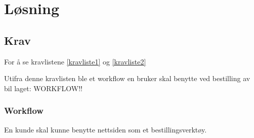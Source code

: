 \chapter{Løsning}

\section{Krav}
For å se kravlistene \ref{kravliste1} og \ref{kravliste2} 



Utifra denne kravlisten ble et workflow en bruker skal benytte ved bestilling av bil laget:
WORKFLOW!!

\subsection{Workflow}
En kunde skal kunne benytte nettsiden som et bestillingsverktøy. %
